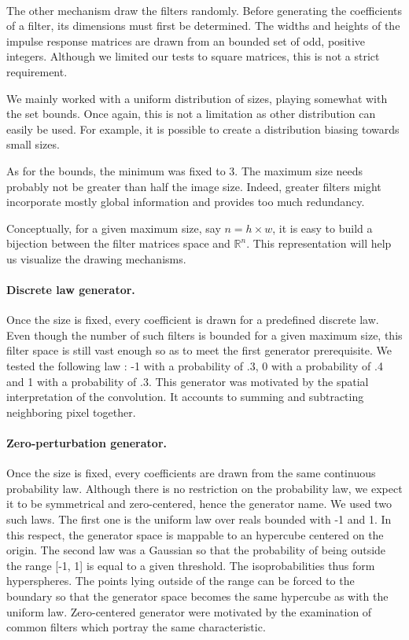 \documentclass[a4paper]{report}
\begin{document}
			\paragraph{}
			The other mechanism draw the filters randomly. Before generating the coefficients of a filter, its dimensions must first be determined. The widths and heights of the impulse response matrices are drawn from an bounded set of odd, positive integers. Although we limited our tests to square matrices, this is not a strict requirement.
			\par
			We mainly worked with a uniform distribution of sizes, playing somewhat with the set bounds. Once again, this is not a limitation as other distribution can easily be used. For example, it is possible to create a distribution biasing towards small sizes. 
			\par
			As for the bounds, the minimum was fixed to 3. The maximum size needs probably not be greater than half the image size. Indeed, greater filters might incorporate mostly global information and provides too much redundancy.
			\par
			Conceptually, for a given maximum size, say $n = h \times w$, it is easy to build a bijection between the filter matrices space and $\mathbb{R}^n$. This representation will help us visualize the drawing mechanisms.
			\paragraph{Discrete law generator.}
			Once the size is fixed, every coefficient is drawn for a predefined discrete law. Even though the number of such filters is bounded for a given maximum size, this filter space is still vast enough so as to meet the first generator prerequisite. We tested the following law : -1 with a probability of .3, 0 with a probability of .4 and 1 with a probability of .3.
			This generator was motivated by the spatial interpretation of the convolution. It accounts to summing and subtracting neighboring pixel together.
			\paragraph{Zero-perturbation generator.}
			Once the size is fixed, every coefficients are drawn from the same continuous probability law. Although there is no restriction on the probability law, we expect it to be symmetrical and zero-centered, hence the generator name. We used two such laws. The first one is the uniform law over reals bounded with -1 and 1. In this respect, the generator space is mappable to an hypercube centered on the origin. The second law was a Gaussian so that the probability of being outside the range [-1, 1] is equal to a given threshold. The isoprobabilities thus form hyperspheres. The points lying outside of the range can be forced to the boundary so that the generator space becomes the same hypercube as with the uniform law. 
			Zero-centered generator were motivated by the examination of common filters which portray the same characteristic.
\end{document}
